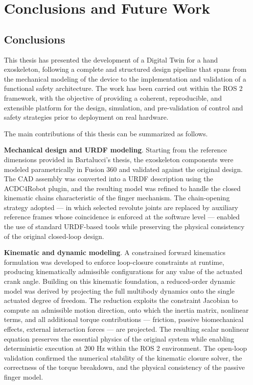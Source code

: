 \chapter{Conclusions and Future Work}
\section{Conclusions}
This thesis has presented the development of a Digital Twin for a hand exoskeleton, following a complete and structured design pipeline that spans from the mechanical modeling of the device to the implementation and validation of a functional safety architecture. The work has been carried out within the ROS 2 framework, with the objective of providing a coherent, reproducible, and extensible platform for the design, simulation, and pre-validation of control and safety strategies prior to deployment on real hardware.

The main contributions of this thesis can be summarized as follows.

\textbf{Mechanical design and URDF modeling}. Starting from the reference dimensions provided in Bartalucci's thesis, the exoskeleton components were modeled parametrically in Fusion 360 and validated against the original design. The CAD assembly was converted into a URDF description using the ACDC4Robot plugin, and the resulting model was refined to handle the closed kinematic chains characteristic of the finger mechanism. The chain-opening strategy adopted — in which selected revolute joints are replaced by auxiliary reference frames whose coincidence is enforced at the software level — enabled the use of standard URDF-based tools while preserving the physical consistency of the original closed-loop design.

\textbf{Kinematic and dynamic modeling}. A constrained forward kinematics formulation was developed to enforce loop-closure constraints at runtime, producing kinematically admissible configurations for any value of the actuated crank angle. Building on this kinematic foundation, a reduced-order dynamic model was derived by projecting the full multibody dynamics onto the single actuated degree of freedom. The reduction exploits the constraint Jacobian to compute an admissible motion direction, onto which the inertia matrix, nonlinear terms, and all additional torque contributions — friction, passive biomechanical effects, external interaction forces — are projected. The resulting scalar nonlinear equation preserves the essential physics of the original system while enabling deterministic execution at 200 Hz within the ROS 2 environment. The open-loop validation confirmed the numerical stability of the kinematic closure solver, the correctness of the torque breakdown, and the physical consistency of the passive finger model.

